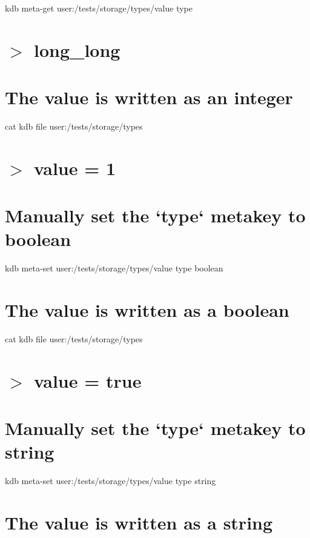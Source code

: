 kdb meta-\/get \textquotesingle{}user\+:/tests/storage/types/value\textquotesingle{} \textquotesingle{}type\textquotesingle{} \hypertarget{autotoc_md642_autotoc_md665}{}\section{$>$ long\+\_\+long}\label{autotoc_md642_autotoc_md665}
\hypertarget{autotoc_md642_autotoc_md666}{}\section{The value is written as an integer}\label{autotoc_md642_autotoc_md666}
cat {\ttfamily kdb file user\+:/tests/storage/types} \hypertarget{autotoc_md642_autotoc_md667}{}\section{$>$ value = 1}\label{autotoc_md642_autotoc_md667}
\hypertarget{autotoc_md642_autotoc_md668}{}\section{Manually set the `type` metakey to boolean}\label{autotoc_md642_autotoc_md668}
kdb meta-\/set \textquotesingle{}user\+:/tests/storage/types/value\textquotesingle{} \textquotesingle{}type\textquotesingle{} \textquotesingle{}boolean\textquotesingle{}\hypertarget{autotoc_md642_autotoc_md669}{}\section{The value is written as a boolean}\label{autotoc_md642_autotoc_md669}
cat {\ttfamily kdb file user\+:/tests/storage/types} \hypertarget{autotoc_md642_autotoc_md670}{}\section{$>$ value = true}\label{autotoc_md642_autotoc_md670}
\hypertarget{autotoc_md642_autotoc_md671}{}\section{Manually set the `type` metakey to string}\label{autotoc_md642_autotoc_md671}
kdb meta-\/set \textquotesingle{}user\+:/tests/storage/types/value\textquotesingle{} \textquotesingle{}type\textquotesingle{} \textquotesingle{}string\textquotesingle{}\hypertarget{autotoc_md642_autotoc_md672}{}\section{The value is written as a string}\label{autotoc_md642_autotoc_md672}
